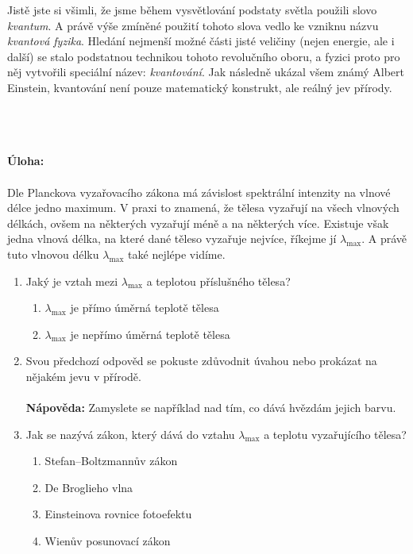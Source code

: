 \documentclass{../../../../style/mkimain}
\begin{document}
Jistě jste si všimli, že jsme během vysvětlování podstaty světla použili slovo \textit{kvantum}.
A právě výše zmíněné použití tohoto slova vedlo ke vzniknu názvu \textit{kvantová fyzika}.
Hledání nejmenší možné části jisté veličiny (nejen energie, ale i další) se stalo podstatnou technikou tohoto revolučního oboru,
a fyzici proto pro něj vytvořili speciální název: \textit{kvantování}.
Jak následně ukázal všem známý Albert Einstein, kvantování není pouze matematický konstrukt, ale reálný jev přírody.
\\
\\
\begin{center}
\end{center}
\\
\\
\textbf{Úloha:}
\\
\\
Dle Planckova vyzařovacího zákona má závislost spektrální intenzity na vlnové délce jedno maximum.
V praxi to znamená, že tělesa vyzařují na všech vlnových délkách, ovšem na některých vyzařují méně a na některých více.
Existuje však jedna vlnová délka, na které dané těleso vyzařuje nejvíce, říkejme jí $\lambda_\mathrm{max}$.
A právě tuto vlnovou délku $\lambda_\mathrm{max}$ také nejlépe vidíme.
\begin{enumerate}
    \item Jaký je vztah mezi $\lambda_\mathrm{max}$ a teplotou příslušného tělesa?
    \begin{enumerate}[label=\alph*)]
        \item $\lambda_\mathrm{max}$ je přímo úměrná teplotě tělesa
        \item $\lambda_\mathrm{max}$ je nepřímo úměrná teplotě tělesa
    \end{enumerate}
    \item Svou předchozí odpověd se pokuste zdůvodnit úvahou nebo prokázat na nějakém jevu v přírodě.
    \\\\
    \textbf{Nápověda:} Zamyslete se například nad tím, co dává hvězdám jejich barvu.
    \item Jak se nazývá zákon, který dává do vztahu $\lambda_\mathrm{max}$ a teplotu vyzařujícího tělesa?
    \begin{enumerate}[label=\alph*)]
        \item Stefan–Boltzmannův zákon
        \item De Broglieho vlna
        \item Einsteinova rovnice fotoefektu
        \item Wienův posunovací zákon
    \end{enumerate} 
\end{enumerate}
\end{document}
